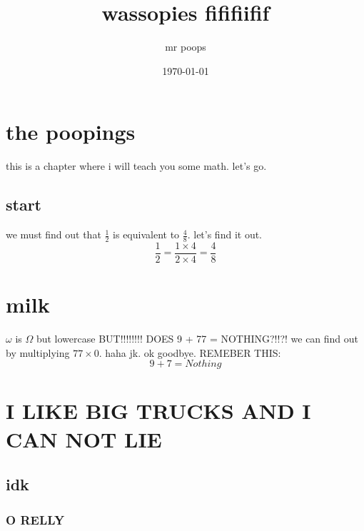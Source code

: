\documentclass[a4paper,12pt]{article}
\begin{document}
\title{wassopies fififiifif}
\author{mr poops}
\date{\today}
\maketitle

\section{the poopings}
this is a chapter where i will teach you some math. let's go.
\subsection{start}
we must find out that $\frac{1}{2}$ is equivalent to $\frac{4}{8}.$
let's find it out.
$$\frac{1}{2} = \frac{1 \times 4}{2 \times 4} = \frac{4}{8}$$
\section{milk}
$\omega$ is $\Omega$ but lowercase
BUT!!!!!!!! DOES 9 + 77 = NOTHING?!!?!
we can find out by multiplying $77 \times 0$. haha jk. ok goodbye.
REMEBER THIS:
$$9 + 7 = Nothing$$
\section{I LIKE BIG TRUCKS AND I CAN NOT LIE}
\subsection{idk}
\subsubsection{O RELLY}
\end{document}
